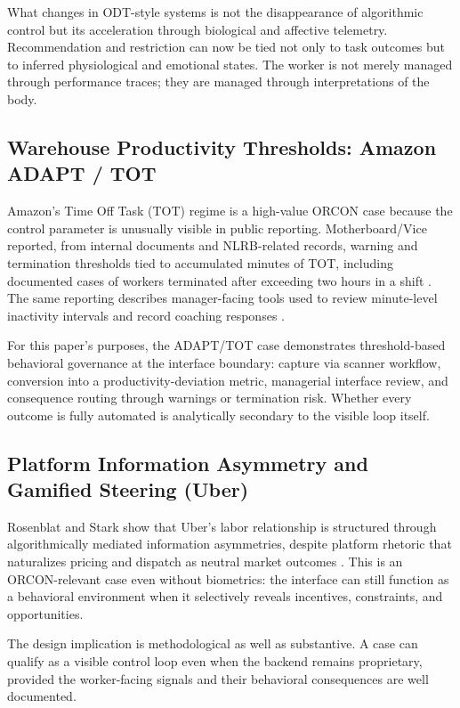 \documentclass[runningheads]{llncs}
\begin{document}
What changes in ODT-style systems is not the disappearance of algorithmic control but its acceleration through biological and affective telemetry. Recommendation and restriction can now be tied not only to task outcomes but to inferred physiological and emotional states. The worker is not merely managed through performance traces; they are managed through interpretations of the body.

\subsection{Warehouse Productivity Thresholds: Amazon ADAPT / TOT}

Amazon's Time Off Task (TOT) regime is a high-value ORCON case because the control parameter is unusually visible in public reporting. Motherboard/Vice reported, from internal documents and NLRB-related records, warning and termination thresholds tied to accumulated minutes of TOT, including documented cases of workers terminated after exceeding two hours in a shift \cite{gurley2022vice}. The same reporting describes manager-facing tools used to review minute-level inactivity intervals and record coaching responses \cite{gurley2022vice}.

For this paper's purposes, the ADAPT/TOT case demonstrates threshold-based behavioral governance at the interface boundary: capture via scanner workflow, conversion into a productivity-deviation metric, managerial interface review, and consequence routing through warnings or termination risk. Whether every outcome is fully automated is analytically secondary to the visible loop itself.

\subsection{Platform Information Asymmetry and Gamified Steering (Uber)}

Rosenblat and Stark show that Uber's labor relationship is structured through algorithmically mediated information asymmetries, despite platform rhetoric that naturalizes pricing and dispatch as neutral market outcomes \cite{rosenblat2016uber}. This is an ORCON-relevant case even without biometrics: the interface can still function as a behavioral environment when it selectively reveals incentives, constraints, and opportunities.

The design implication is methodological as well as substantive. A case can qualify as a visible control loop even when the backend remains proprietary, provided the worker-facing signals and their behavioral consequences are well documented.
\end{document}
